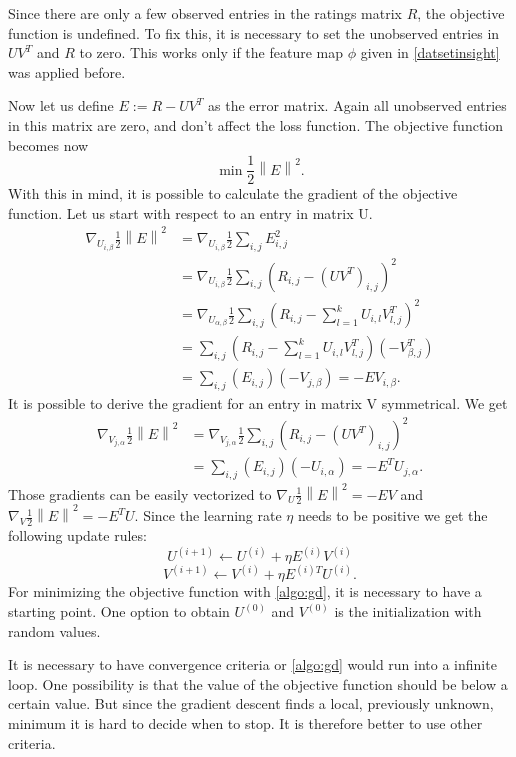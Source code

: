 \documentclass[DIV=14,twocolumn]{scrartcl}
\newcommand{\norm}[1]{\left\lVert#1\right\rVert}
\begin{document}
Since there are only a few observed entries in the ratings matrix $R$, the objective function is undefined. To fix this, it is necessary to set the unobserved entries in $UV^T$ and $R$ to zero. This works only if the feature map $\phi$ given in \autoref{datsetinsight} was applied before. 

Now let us define $E:=R-UV^T$ as the error matrix. Again all unobserved entries in this matrix are zero, and don't affect the loss function. The objective function becomes now \[\min\frac{1}{2}\norm{E}^2.\]
With this in mind, it is possible to calculate the gradient of the objective function.
Let us start with respect to an entry in matrix U.
\begin{equation*}
\begin{split}
\nabla_{U_{i,\beta}} \frac{1}{2}\norm{E}^2 &= \nabla_{U_{i,\beta}} \frac{1}{2}\sum_{i,j}E_{i,j}^2 \\ &=\nabla_{U_{i,\beta}} \frac{1}{2}\sum_{i,j}(R_{i,j}-(UV^T)_{i,j})^2 \\
&=\nabla_{U_{\alpha,\beta}} \frac{1}{2}\sum_{i,j}(R_{i,j}-\sum_{l=1}^k U_{i,l}V^T_{l,j})^2\\
&=\sum_{i,j}(R_{i,j}-\sum_{l=1}^k U_{i,l}V^T_{l,j})(-V^T_{\beta,j})\\
&=\sum_{i,j}(E_{i,j})(-V_{j,\beta})=-EV_{i,\beta}.
\end{split}
\end{equation*}
It is possible to derive the gradient for an entry in matrix V symmetrical. We get 
\begin{equation*}
\begin{split}
\nabla_{V_{j,\alpha}} \frac{1}{2}\norm{E}^2 &= \nabla_{V_{j,\alpha}} \frac{1}{2}\sum_{i,j}(R_{i,j}-(UV^T)_{i,j})^2\\
&=\sum_{i,j}(E_{i,j})(-U_{i,\alpha})=-E^TU_{j,\alpha}.
\end{split}
\end{equation*}
Those gradients can be easily vectorized to $\nabla_U \frac{1}{2}\norm{E}^2=-EV$ and  $\nabla_V \frac{1}{2}\norm{E}^2=-E^TU.$ Since the learning rate $\eta$ needs to be positive we get the following update rules: \[U^{(i+1)} \leftarrow U^{(i)} + \eta E^{(i)}V^{(i)}\] \[V^{(i+1)} \leftarrow V^{(i)} + \eta E^{(i)T}U^{(i)}.\]
For minimizing the objective function with \autoref{algo:gd}, it is necessary to have a starting point. One option to obtain $U^{(0)}$ and $V^{(0)}$ is the initialization with random values. 

It is necessary to have convergence criteria or \autoref{algo:gd} would run into a infinite loop. One possibility is that the value of the objective function should be below a certain value. But since the gradient descent finds a local, previously unknown, minimum it is hard to decide when to stop. It is therefore better to use other criteria. 
\end{document}
